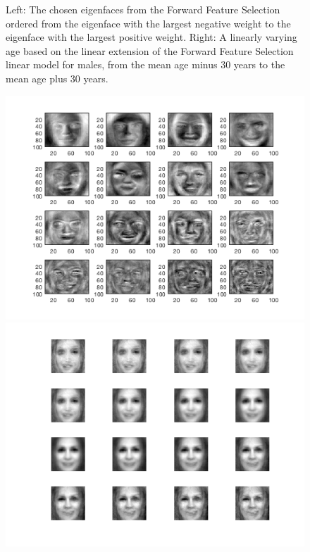 \begin{figure}[ht!]
\begin{minipage}{0.49\textwidth}
    \end{minipage}
    \caption{Left: The chosen eigenfaces from the Forward Feature Selection ordered from the eigenface with the largest negative weight to the eigenface with the largest positive weight. Right: A linearly varying age based on the linear extension of the Forward Feature Selection linear model for males, from the mean age minus 30 years to the mean age plus 30 years.}
    \label{fig:M_fs}
\end{figure}

\begin{figure}[ht!]
    \centering
    \begin{minipage}{0.49\textwidth}
    \includegraphics[width=1\linewidth]{fig/F_fs.png}
    \end{minipage}
    \begin{minipage}{0.49\textwidth}
    \includegraphics[width=1\linewidth]{fig/F_fs_Age.png}

\end{minipage}
\end{figure}
